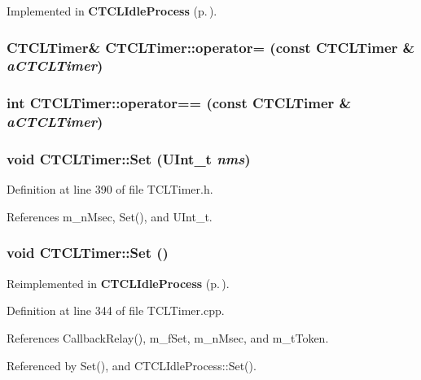 Implemented in {\bf CTCLIdle\-Process} {\rm (p.\,\pageref{classCTCLIdleProcess_a6})}.
\subsubsection{\setlength{\rightskip}{0pt plus 5cm}CTCLTimer\& CTCLTimer::operator= (const CTCLTimer \& {\em a\-CTCLTimer})\hspace{0.3cm}{\tt  [private]}}\label{classCTCLTimer_c1}


\subsubsection{\setlength{\rightskip}{0pt plus 5cm}int CTCLTimer::operator== (const CTCLTimer \& {\em a\-CTCLTimer})\hspace{0.3cm}{\tt  [private]}}\label{classCTCLTimer_c2}


\subsubsection{\setlength{\rightskip}{0pt plus 5cm}void CTCLTimer::Set ({\bf UInt\_\-t} {\em nms})\hspace{0.3cm}{\tt  [inline]}}\label{classCTCLTimer_a8}




Definition at line 390 of file TCLTimer.h.

References m\_\-n\-Msec, Set(), and UInt\_\-t.
\subsubsection{\setlength{\rightskip}{0pt plus 5cm}void CTCLTimer::Set ()}\label{classCTCLTimer_a7}




Reimplemented in {\bf CTCLIdle\-Process} {\rm (p.\,\pageref{classCTCLIdleProcess_a4})}.

Definition at line 344 of file TCLTimer.cpp.

References Callback\-Relay(), m\_\-f\-Set, m\_\-n\-Msec, and m\_\-t\-Token.

Referenced by Set(), and CTCLIdle\-Process::Set().
